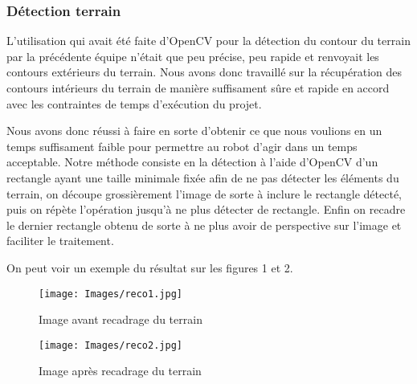 \subsubsection{Détection terrain}
\label{subs:Détection terrain}
\par L'utilisation qui avait été faite d'OpenCV pour la détection du contour du
terrain par la précédente équipe n'était que
peu précise, peu rapide et renvoyait les contours extérieurs du terrain. Nous avons donc
travaillé sur la récupération des contours intérieurs du terrain de manière
suffisament sûre et rapide en accord avec les contraintes de temps d'exécution du projet.
\par Nous avons donc réussi à faire en sorte d'obtenir ce que nous voulions en
un temps suffisament faible pour permettre au robot d'agir dans un temps
acceptable. Notre méthode consiste en la détection à l'aide d'OpenCV d'un
rectangle ayant une taille minimale fixée afin de ne pas détecter les éléments
du terrain, on découpe grossièrement l'image de sorte à inclure le rectangle
détecté, puis on répète l'opération jusqu'à ne plus détecter de rectangle. Enfin
on recadre le dernier rectangle obtenu de sorte à ne plus avoir de
perspective sur l'image et faciliter le traitement.
\par On peut voir un exemple du résultat sur les figures 1 et 2.
\begin{figure}[h]
    \begin{minipage}[c]{.46\linewidth}
        \centering
        \texttt{[image: Images/reco1.jpg]}
        \caption{Image avant recadrage du terrain}
    \end{minipage}
    \hfill%
    \begin{minipage}[c]{.46\linewidth}
        \centering
        \texttt{[image: Images/reco2.jpg]}
        \caption{Image après recadrage du terrain}
    \end{minipage}
\end{figure}

